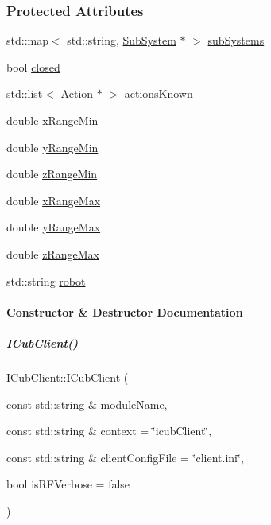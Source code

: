 \subsubsection*{Protected Attributes}
\begin{DoxyCompactItemize}
\item 
std\+::map$<$ std\+::string, \hyperlink{group__icubclient__subsystems_classicubclient_1_1SubSystem}{Sub\+System} $\ast$ $>$ \hyperlink{group__icubclient__clients_a7f57e7b935843803fe1c098f5ce01cb3}{sub\+Systems}
\item 
bool \hyperlink{group__icubclient__clients_a08b2e9fb2884b6c42c872bfafecea4f1}{closed}
\item 
std\+::list$<$ \hyperlink{group__icubclient__representations_classicubclient_1_1Action}{Action} $\ast$ $>$ \hyperlink{group__icubclient__clients_a93d0abd1eaf1006e53e6a3cec00a7297}{actions\+Known}
\item 
double \hyperlink{group__icubclient__clients_aab67a0f3fe46c8b3a537464bf6cfe1cc}{x\+Range\+Min}
\item 
double \hyperlink{group__icubclient__clients_a5ad10026486abc1bdb8e2625a488633a}{y\+Range\+Min}
\item 
double \hyperlink{group__icubclient__clients_a1006409da155ce1f67418577656c04b7}{z\+Range\+Min}
\item 
double \hyperlink{group__icubclient__clients_a7e53916315fedd2230c6af7c3c639a35}{x\+Range\+Max}
\item 
double \hyperlink{group__icubclient__clients_a9fade7afd90baf2a7f5bae908d801ecb}{y\+Range\+Max}
\item 
double \hyperlink{group__icubclient__clients_a10631424384ecdfc1a34c4a30b9acaed}{z\+Range\+Max}
\item 
std\+::string \hyperlink{group__icubclient__clients_a05b88ac70c854a3526a28b8fde540ebc}{robot}
\end{DoxyCompactItemize}


\paragraph{Constructor \& Destructor Documentation}
\mbox{\label{group__icubclient__clients_a50ca757de4db9723eaf872791a8c20c8}} 
\subparagraph{\texorpdfstring{I\+Cub\+Client()}{ICubClient()}}
{\footnotesize\ttfamily I\+Cub\+Client\+::\+I\+Cub\+Client (\begin{DoxyParamCaption}\item[{const std\+::string \&}]{module\+Name,  }\item[{const std\+::string \&}]{context = {\ttfamily \char`\"{}icubClient\char`\"{}},  }\item[{const std\+::string \&}]{client\+Config\+File = {\ttfamily \char`\"{}client.ini\char`\"{}},  }\item[{bool}]{is\+R\+F\+Verbose = {\ttfamily false} }\end{DoxyParamCaption})}



